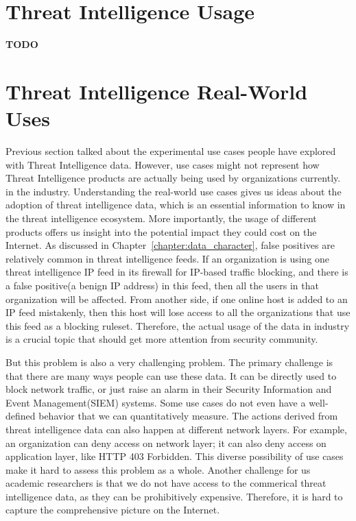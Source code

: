 \section{Threat Intelligence Usage}
\textbf{TODO}

\section{Threat Intelligence Real-World Uses}

Previous section talked about the experimental use cases people have explored
with Threat Intelligence data. However, use cases might not represent how
Threat Intelligence products are actually being used by organizations currently.
in the industry. Understanding the real-world use cases gives us ideas about 
the adoption of threat
intelligence data, which is an essential information to know in the threat
intelligence ecosystem. More importantly, the usage of different products offers
us insight into the potential impact they could cost on the Internet. As 
discussed in Chapter~\ref{chapter:data_character}, false positives are relatively 
common in threat intelligence feeds. If an organization is using one threat
intelligence IP feed in its firewall for IP-based traffic blocking, and there
is a false positive(a benign IP address) in this feed, then all the users in
that organization will be affected. From another side, if one online host is
added to an IP feed mistakenly, then this host will lose access to all the
organizations that use this feed as a blocking ruleset. Therefore, the actual
usage of the data in industry is a crucial topic that should get more attention
from security community.

But this problem is also a very challenging problem. The primary challenge 
is that there are many ways people can use these data. It can be directly 
used to block network traffic, or just raise an alarm in their Security
Information and Event Management(SIEM) systems. Some use cases do not even 
have a well-defined behavior that we can quantitatively measure. 
The actions derived from threat intelligence data can also happen at different
network layers. For example, an organization can deny access on network layer; 
it can also deny access on application layer, like HTTP 403 Forbidden. 
This diverse possibility of use cases make it hard to assess this problem as 
a whole. Another challenge for us academic researchers is that we do not have 
access to the commerical threat intelligence data, as they can be prohibitively
expensive. Therefore, it is hard to capture the comprehensive picture on the
Internet.

